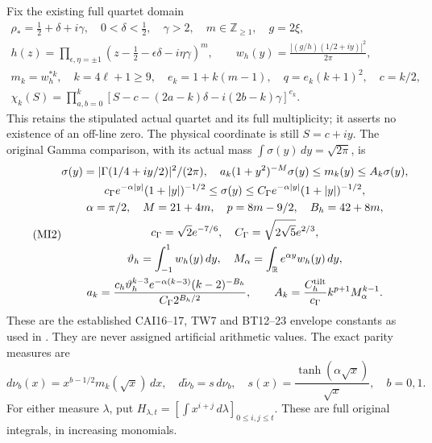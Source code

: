 \documentclass[11pt]{article}
\newcommand{\R}{\mathbb R}
\begin{document}
Fix the existing full quartet domain
\begin{equation}\tag{MI1}\label{mi:objects}
\begin{gathered}
 \rho_*=\tfrac12+\delta+i\gamma,\quad0<\delta<\tfrac12,\quad
 \gamma>2,\quad m\in\mathbb Z_{\ge1},\quad g=2\xi,\\
 h(z)=\prod_{\epsilon,\eta=\pm1}
       (z-\tfrac12-\epsilon\delta-i\eta\gamma)^m,\qquad
 w_h(y)=\frac{|(g/h)(1/2+iy)|^2}{2\pi},\\
 m_k=w_h^{*k},\quad k=4\ell+1\ge9,\quad
 e_k=1+k(m-1),\quad q=e_k(k+1)^2,\quad c=k/2,\\
 \chi_k(S)=\prod_{a,b=0}^k
 [S-c-(2a-k)\delta-i(2b-k)\gamma]^{e_k}.
\end{gathered}
\end{equation}
This retains the stipulated actual quartet and its full multiplicity;
it asserts no existence of an off-line zero. The physical coordinate
is still $S=c+iy$. The original Gamma comparison, with its actual
mass $\int\sigma(y)\,dy=\sqrt{2\pi}$, is
\begin{equation}\tag{MI2}\label{mi:env}
\begin{gathered}
 \sigma(y)=|\Gamma(1/4+iy/2)|^2/(2\pi),\quad
 a_k(1+y^2)^{-M}\sigma(y)\le m_k(y)\le A_k\sigma(y),\\
 c_\Gamma e^{-\alpha|y|}(1+|y|)^{-1/2}
 \le\sigma(y)\le C_\Gamma e^{-\alpha|y|}(1+|y|)^{-1/2},\\
 \alpha=\pi/2,\quad M=21+4m,\quad p=8m-9/2,\quad B_h=42+8m,\\
 c_\Gamma=\sqrt2e^{-7/6},\quad C_\Gamma=\sqrt{2\sqrt5}e^{2/3},\\
 \vartheta_h=\int_{-1}^1w_h(y)\,dy,\quad
 M_\alpha=\int_\R e^{\alpha y}w_h(y)\,dy,\\
 a_k=\frac{c_h\vartheta_h^{k-3}e^{-\alpha(k-3)}(k-2)^{-B_h}}
                 {C_\Gamma2^{B_h/2}},\qquad
 A_k=\frac{C_h^{\rm tilt}}{c_\Gamma}k^{p+1}M_\alpha^{k-1}.
\end{gathered}
\end{equation}
These are the established CAI16--17, TW7 and BT12--23 envelope
constants as used in \cite{oldNP,BT}. They are never assigned
artificial arithmetic values. The exact parity measures are
\begin{equation}\tag{MI3}\label{mi:parity}
 d\nu_b(x)=x^{b-1/2}m_k(\sqrt x)\,dx,\quad
 d\widetilde\nu_b=s\,d\nu_b,\quad
 s(x)=\frac{\tanh(\alpha\sqrt x)}{\sqrt x},\quad b=0,1.
\end{equation}
For either measure $\lambda$, put
$H_{\lambda,t}=[\int x^{i+j}\,d\lambda]_{0\le i,j\le t}$.
These are full original integrals, in increasing monomials.
\end{document}
